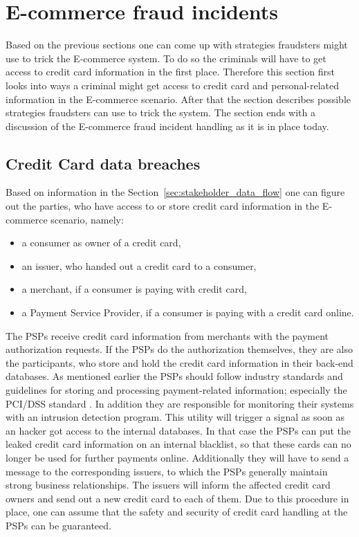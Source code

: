 
\section{\gls{E-commerce} fraud incidents}
\label{sec:scenario_fraud}

Based on the previous sections one can come up with strategies fraudsters might use to trick the \gls{E-commerce} system. To do so the criminals will have to get access to credit card information in the first place. Therefore this section first looks into ways a criminal might get access to credit card and personal-related information in the \gls{E-commerce} scenario. After that the section describes possible strategies fraudsters can use to trick the system. The section ends with a discussion of the \gls{E-commerce} fraud incident handling as it is in place today.

\subsection{Credit Card data breaches}
\label{subsec:leaking_credit_cards}

Based on information in the Section~\ref{sec:stakeholder_data_flow} one can figure out the parties, who have access to or store credit card information in the \gls{E-commerce} scenario, namely:\@

\begin{itemize}
  \item a consumer as owner of a credit card,
  \item an issuer, who handed out a credit card to a consumer,
  \item a merchant, if a consumer is paying with credit card,
  \item a Payment Service Provider, if a consumer is paying with a credit card online.
\end{itemize}

The \gls{PSP}s receive credit card information from merchants with the payment authorization requests. If the \gls{PSP}s do the authorization themselves, they are also the participants, who store and hold the credit card information in their back-end databases. As mentioned earlier the \gls{PSP}s should follow industry standards and guidelines for storing and processing payment-related information; especially the \gls{PCI/DSS} standard \citep{virtue2009payment}. In addition they are responsible for monitoring their systems with an intrusion detection program. This utility will trigger a signal as soon as an hacker got access to the internal databases. In that case the \gls{PSP}s can put the leaked credit card information on an internal blacklist, so that these cards can no longer be used for further payments online. Additionally they will have to send a message to the corresponding issuers, to which the \gls{PSP}s generally maintain strong business relationships. The issuers will inform the affected credit card owners and send out a new credit card to each of them. Due to this procedure in place, one can assume that the safety and security of credit card handling at the \gls{PSP}s can be guaranteed. \\

